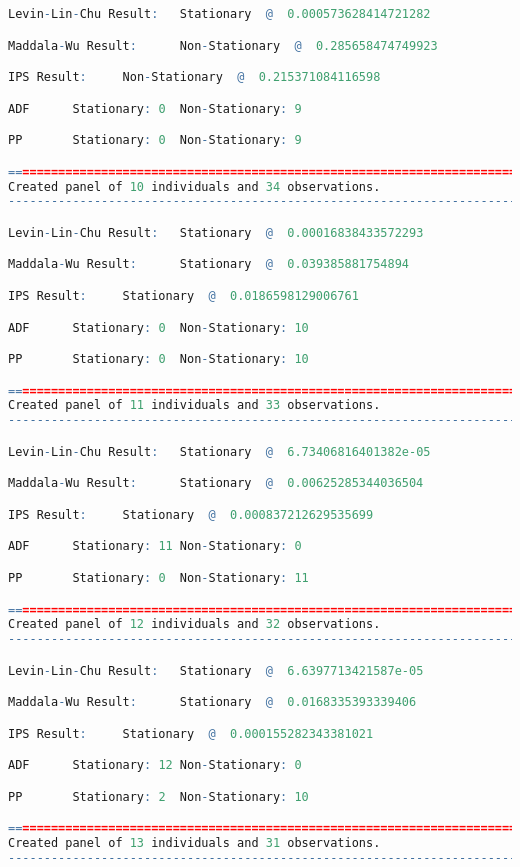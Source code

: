 \begin{lstlisting}[language=R]
Levin-Lin-Chu Result:   Stationary  @  0.000573628414721282

Maddala-Wu Result:      Non-Stationary  @  0.285658474749923

IPS Result:     Non-Stationary  @  0.215371084116598

ADF      Stationary: 0  Non-Stationary: 9

PP       Stationary: 0  Non-Stationary: 9

=========================================================================
Created panel of 10 individuals and 34 observations.
-------------------------------------------------------------------------

Levin-Lin-Chu Result:   Stationary  @  0.00016838433572293

Maddala-Wu Result:      Stationary  @  0.039385881754894

IPS Result:     Stationary  @  0.0186598129006761

ADF      Stationary: 0  Non-Stationary: 10

PP       Stationary: 0  Non-Stationary: 10

=========================================================================
Created panel of 11 individuals and 33 observations.
-------------------------------------------------------------------------

Levin-Lin-Chu Result:   Stationary  @  6.73406816401382e-05

Maddala-Wu Result:      Stationary  @  0.00625285344036504

IPS Result:     Stationary  @  0.000837212629535699

ADF      Stationary: 11 Non-Stationary: 0

PP       Stationary: 0  Non-Stationary: 11

=========================================================================
Created panel of 12 individuals and 32 observations.
-------------------------------------------------------------------------

Levin-Lin-Chu Result:   Stationary  @  6.6397713421587e-05

Maddala-Wu Result:      Stationary  @  0.0168335393339406

IPS Result:     Stationary  @  0.000155282343381021

ADF      Stationary: 12 Non-Stationary: 0

PP       Stationary: 2  Non-Stationary: 10

=========================================================================
Created panel of 13 individuals and 31 observations.
-------------------------------------------------------------------------


\end{lstlisting}
